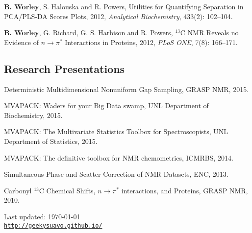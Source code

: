 \documentclass[letterpaper]{article}
\def\footerlink{http://geekysuavo.github.io/}
\renewenvironment{itemize}{
  \begin{list}{}{
    \setlength{\leftmargin}{1.5em}
  }
}{
  \end{list}
}
\begin{document}
\begin{itemize}
\item \textbf{B. Worley}, S. Halouska and R. Powers,
 Utilities for Quantifying Separation in PCA/PLS-DA Scores Plots, 2012,
 {\it Analytical Biochemistry}, 433(2): 102--104.
\end{itemize}

\begin{itemize}
\item \textbf{B. Worley}, G. Richard, G. S. Harbison and R. Powers,
  $^{13}$C NMR Reveals no Evidence of $n\rightarrow\pi^*$ Interactions
  in Proteins, 2012, {\it PLoS ONE}, 7(8): 166--171.
\end{itemize}

\subsection*{Research Presentations}

\begin{itemize}
\item Deterministic Multidimensional Nonuniform Gap Sampling,
  GRASP NMR, 2015.
\end{itemize}

\begin{itemize}
\item MVAPACK: Waders for your Big Data swamp,
  UNL Department of Biochemistry, 2015.
\end{itemize}

\begin{itemize}
\item MVAPACK: The Multivariate Statistics Toolbox for Spectroscopists,
  UNL Department of Statistics, 2015.
\end{itemize}

\begin{itemize}
\item MVAPACK: The definitive toolbox for NMR chemometrics, ICMRBS, 2014.
\end{itemize}

\begin{itemize}
\item Simultaneous Phase and Scatter Correction of NMR Datasets, ENC, 2013.
\end{itemize}

\begin{itemize}
\item Carbonyl $^{13}$C Chemical Shifts, $n\rightarrow\pi^*$ interactions,
  and Proteins, GRASP NMR, 2010.
\end{itemize}

\bigskip

\begin{center}
  \begin{footnotesize}
    Last updated: \today \\
    \href{\footerlink}{\texttt{\footerlink}}
  \end{footnotesize}
\end{center}

\end{document}
